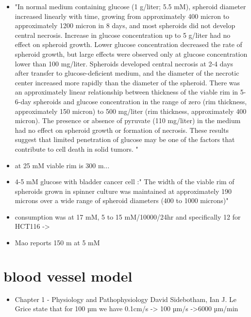 \documentclass[11pt,a4paper]{article}
\begin{document}
\begin{itemize}
\item "In normal medium containing glucose (1 g/liter; 5.5 mM), spheroid diameter increased linearly with time, growing from approximately 400 micron to approximately 1200 micron in 8 days, and most spheroids did not develop central necrosis. Increase in glucose concentration up to 5 g/liter had no effect on spheroid growth. Lower glucose concentration decreased the rate of spheroid growth, but large effects were observed only at glucose concentration lower than 100 mg/liter. Spheroids developed central necrosis at 2-4 days after transfer to glucose-deficient medium, and the diameter of the necrotic center increased more rapidly than the diameter of the spheroid. There was an approximately linear relationship between thickness of the viable rim in 5-6-day spheroids and glucose concentration in the range of zero (rim thickness, approximately 150 micron) to 500 mg/liter (rim thickness, approximately 400 micron). The presence or absence of pyruvate (110 mg/liter) in the medium had no effect on spheroid growth or formation of necrosis. These results suggest that limited penetration of glucose may be one of the factors that contribute to cell death in solid tumors. "\cite{Tannock1986}

\item at 25 mM viable rim is 300 \textmu m... \cite{Walenta2000}

\item  4-5 mM glucose with bladder cancer cell :"
The width of the viable rim of spheroids grown in spinner culture was maintained at approximately 190 microns over a wide range of spheroid diameters (400 to 1000 microns)"\cite{Erlichman1986}

\item consumption was at 17 mM,  5 to 15 mM/10000/24hr
and specifically 12 for HCT116 -> \cite{Kammerer2015}

\item Mao reports 150 \textmu m at 5 mM
\end{itemize}

\section{blood vessel model}
\begin{itemize}
\item Chapter 1 - Physiology and Pathophysiology
David Sidebotham, Ian J. Le Grice state that for 100 µm we have 0.1cm/s -> 100 µm/s ->6000 µm/min
\end{itemize}
\end{document}
